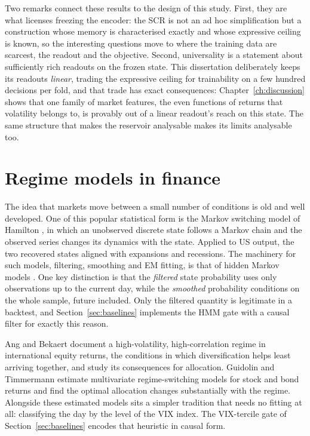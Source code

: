 Two remarks connect these results to the design of this study. First, they are what licenses freezing the encoder: the SCR is not an ad hoc simplification but a construction whose memory is characterised exactly and whose expressive ceiling is known, so the interesting questions move to where the training data are scarcest, the readout and the objective. Second, universality is a statement about sufficiently rich readouts on the frozen state. This dissertation deliberately keeps its readouts \emph{linear}, trading the expressive ceiling for trainability on a few hundred decisions per fold, and that trade has exact consequences: Chapter~\ref{ch:discussion} shows that one family of market features, the even functions of returns that volatility belongs to, is provably out of a linear readout's reach on this state. The same structure that makes the reservoir analysable makes its limits analysable too.

\section{Regime models in finance}
\label{sec:bg-regimes}

The idea that markets move between a small number of conditions is old and well developed. One of this popular statistical form is the Markov switching model of Hamilton \cite{hamilton1989new}, in which an unobserved discrete state follows a Markov chain and the observed series changes its dynamics with the state. Applied to US output, the two recovered states aligned with expansions and recessions. The machinery for such models, filtering, smoothing and EM fitting, is that of hidden Markov models \cite{rabiner1989tutorial}. One key distinction is that the \emph{filtered} state probability uses only observations up to the current day, while the \emph{smoothed} probability conditions on the whole sample, future included. Only the filtered quantity is legitimate in a backtest, and Section~\ref{sec:baselines} implements the HMM gate with a causal filter for exactly this reason.

Ang and Bekaert \cite{ang2002international} document a high-volatility, high-correlation regime in international equity returns, the conditions in which diversification helps least arriving together, and study its consequences for allocation. Guidolin and Timmermann \cite{guidolin2007asset} estimate multivariate regime-switching models for stock and bond returns and find the optimal allocation changes substantially with the regime. Alongside these estimated models sits a simpler tradition that needs no fitting at all: classifying the day by the level of the VIX index. The VIX-tercile gate of Section~\ref{sec:baselines} encodes that heuristic in causal form.

